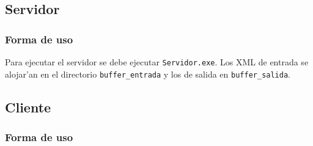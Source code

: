 \subsection{Servidor}
\subsubsection{Forma de uso}
Para ejecutar el servidor se debe ejecutar \verb|Servidor.exe|. Los XML de entrada se alojar'an en el directorio \verb|buffer_entrada| y los de salida en \verb|buffer_salida|. 



\subsection{Cliente}
\subsubsection{Forma de uso}
